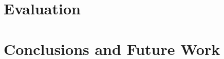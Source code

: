 \documentclass[sigconf]{acmart}
\begin{document}

\section{Evaluation}


\section{Conclusions and Future Work}


\balance


\end{document}
